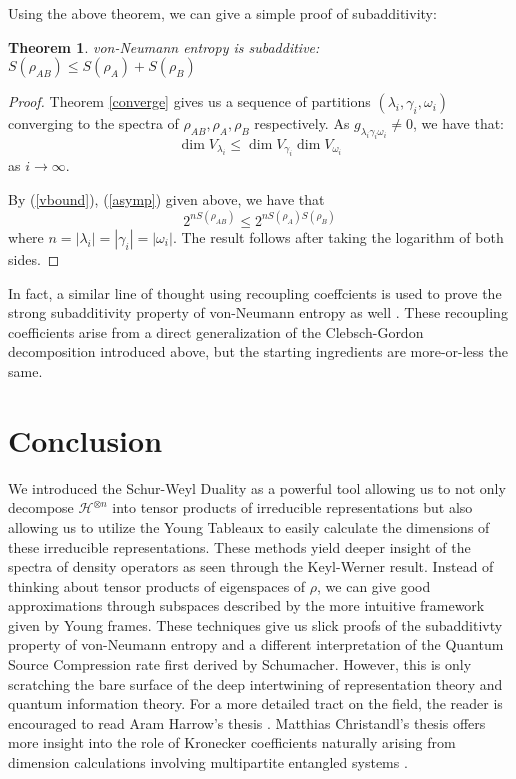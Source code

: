 \documentclass[12pt]{article}%
\newtheorem{thm}{Theorem}
\begin{document}
\noindent Using the above theorem, we can give a simple proof of subadditivity:
\begin{thm}
  von-Neumann entropy is subadditive: $S(\rho_{AB}) \leq S(\rho_A) + S(\rho_B)$
\end{thm}
\begin{proof}
  Theorem \ref{converge} gives us a sequence of partitions $(\lambda_i,\gamma_i, \omega_i)$ converging to the spectra of $\rho_{AB}, \rho_A, \rho_B$ respectively. As $g_{\lambda_i\gamma_i\omega_i} \neq 0$, we have that:
  $$ \dim{V_{\lambda_i}} \leq \dim{V_{\gamma_i}}\dim{V_{\omega_i}} $$ as $i \rightarrow \infty$.

  \noindent By (\ref{vbound}), (\ref{asymp}) given above, we have that
  $$2^{nS(\rho_{AB})} \leq 2^{nS(\rho_A)S(\rho_B)}$$
  where $n = |\lambda_i| = |\gamma_i| = |\omega_i|$. The result follows after taking the logarithm of both sides.
\end{proof}

In fact, a similar line of thought using recoupling coeffcients is used to prove the strong subadditivity property of von-Neumann entropy as well \cite{CSW}. These recoupling coefficients arise from a direct generalization of the Clebsch-Gordon decomposition introduced above, but the starting ingredients are more-or-less the same.

\section{Conclusion}
We introduced the Schur-Weyl Duality as a powerful tool allowing us to not only decompose $\mathcal{H}^{\otimes n}$ into tensor products of irreducible representations but also allowing us to utilize the Young Tableaux to easily calculate the dimensions of these irreducible representations. These methods yield deeper insight of the spectra of density operators as seen through the Keyl-Werner result. Instead of thinking about tensor products of eigenspaces of $\rho$, we can give good approximations through subspaces described by the more intuitive framework given by Young frames. These techniques give us slick proofs of the subadditivty property of von-Neumann entropy and a different interpretation of the Quantum Source Compression rate first derived by Schumacher. However, this is only scratching the bare surface of the deep intertwining of representation theory and quantum information theory. For a more detailed tract on the field, the reader is encouraged to read Aram Harrow's thesis \cite{harrow}. Matthias Christandl's thesis offers more insight into the role of Kronecker coefficients naturally arising from dimension calculations involving multipartite entangled systems \cite{chris}.



\end{document}
